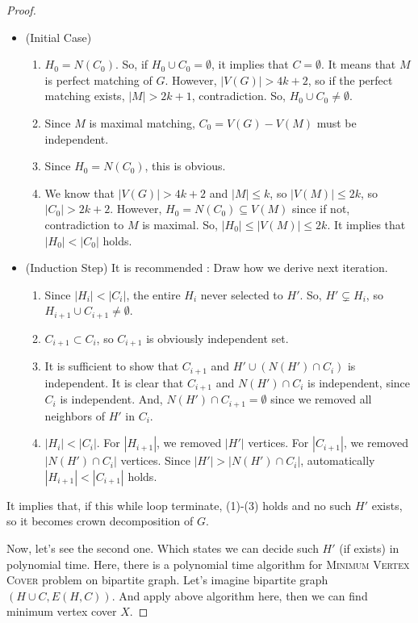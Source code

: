 \documentclass[12pt, a4paper, openany, twoside]{book}
\theoremstyle{definition}
\theoremstyle{remark}
\theoremstyle{plain}
\numberwithin{equation}{section}
\begin{document}
\begin{proof}
\begin{itemize}
    \item (Initial Case)
    \begin{enumerate}
        \item $H_0 = N(C_0)$. So, if $H_0 \cup C_0 = \emptyset$, it implies that $C = \emptyset$. It means that 
        $M$ is perfect matching of $G$. However, $|V(G)| > 4k + 2$, so if the perfect matching exists, $|M| > 2k + 1$, contradiction. So, $H_0 \cup C_0 \neq \emptyset$. 
        \item Since $M$ is maximal matching, $C_0 = V(G) - V(M)$ must be independent. 
        \item Since $H_0 = N(C_0)$, this is obvious. 
        \item We know that $|V(G)| > 4k + 2$ and $|M| \leq k$, so $|V(M)| \leq 2k$, so $|C_0| > 2k + 2$. However, 
        $H_0 = N(C_0) \subseteq V(M)$ since if not, contradiction to $M$ is maximal. So, $|H_0| \leq |V(M)| \leq 2k$. 
        It implies that $|H_0| < |C_0|$ holds. 
    \end{enumerate}
    \item (Induction Step)
    It is recommended : Draw how we derive next iteration. 
    \begin{enumerate}
        \item Since $|H_i| < |C_i|$, the entire $H_i$ never selected to $H'$. So, $H' \subsetneq H_i$, so $H_{i+1} \cup C_{i+1} \neq \emptyset$. 
        \item $C_{i+1} \subset C_i$, so $C_{i+1}$ is obviously independent set. 
        \item It is sufficient to show that $C_{i+1}$ and $H' \cup (N(H') \cap C_i)$ is independent. 
        It is clear that $C_{i+1}$ and $N(H') \cap C_i$ is independent, since $C_i$ is independent. And, $N(H') \cap C_{i+1} = \emptyset$ since we removed all neighbors of $H'$ in $C_i$. 
        \item $|H_i| < |C_i|$. For $|H_{i+1}|$, we removed $|H'|$ vertices. For $|C_{i+1}|$, we removed $|N(H') \cap C_i|$ vertices. Since $|H'| > |N(H') \cap C_i|$, automatically $|H_{i+1}| < |C_{i+1}|$ holds. 
    \end{enumerate}
\end{itemize}

It implies that, if this while loop terminate, (1)-(3) holds and no such $H'$ exists, so it becomes crown decomposition of $G$. 

Now, let's see the second one. Which states we can decide such $H'$ (if exists) in polynomial time. Here, 
there is a polynomial time algorithm for \textsc{Minimum Vertex Cover} problem on bipartite graph. 
Let's imagine bipartite graph $(H \cup C, E(H, C))$. And apply above algorithm here, 
then we can find minimum vertex cover $X$. 


\end{proof}
\end{document}
